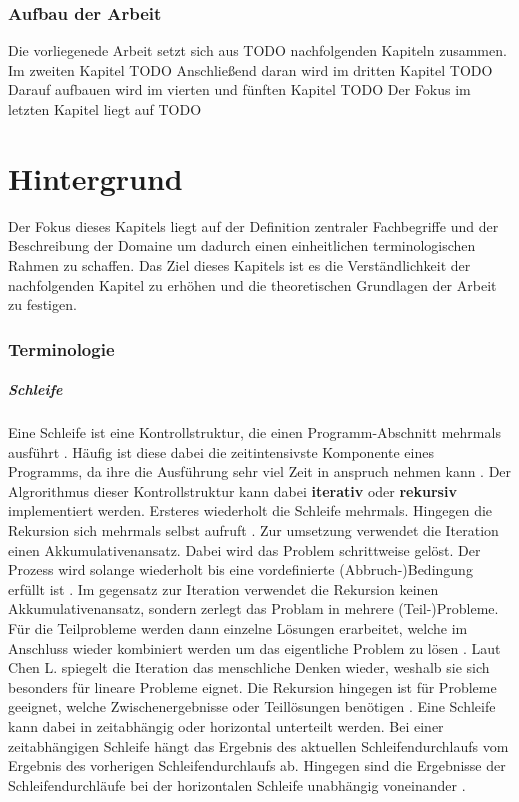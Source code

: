     \subsection{Aufbau der Arbeit}
    Die vorliegenede Arbeit setzt sich aus TODO nachfolgenden Kapiteln zusammen. 
    Im zweiten Kapitel TODO
    Anschließend daran wird im dritten Kapitel TODO
    Darauf aufbauen wird im vierten und fünften Kapitel TODO
    Der Fokus im letzten Kapitel liegt auf TODO 
    \newpage
    \chapter{Hintergrund}
    Der Fokus dieses Kapitels liegt auf der Definition zentraler Fachbegriffe und der Beschreibung der Domaine um dadurch einen einheitlichen terminologischen Rahmen zu schaffen. 
    Das Ziel dieses Kapitels ist es die Verständlichkeit der nachfolgenden Kapitel zu erhöhen und die theoretischen Grundlagen der Arbeit zu festigen.
    \subsection{Terminologie}
    \label{Terminologie}
    \paragraph{Schleife}
    Eine Schleife ist eine Kontrollstruktur, die einen Programm-Abschnitt mehrmals ausführt \cite{22}.
    Häufig ist diese dabei die zeitintensivste Komponente eines Programms, da ihre die Ausführung sehr viel Zeit in anspruch nehmen kann \cite{1}.
    Der Algrorithmus dieser Kontrollstruktur kann dabei \textbf{iterativ} oder \textbf{rekursiv} implementiert werden. Ersteres wiederholt die Schleife mehrmals. Hingegen die Rekursion sich mehrmals selbst aufruft \cite{3}.
    Zur umsetzung verwendet die Iteration einen Akkumulativenansatz. Dabei wird das Problem schrittweise gelöst. Der Prozess wird solange wiederholt bis eine vordefinierte (Abbruch-)Bedingung erfüllt ist \cite{3}.
    Im gegensatz zur Iteration verwendet die Rekursion keinen Akkumulativenansatz, sondern zerlegt das Problam in mehrere (Teil-)Probleme. Für die Teilprobleme werden dann einzelne Lösungen erarbeitet, welche im Anschluss wieder kombiniert werden um das eigentliche Problem zu lösen \cite{3}.
    Laut Chen L. spiegelt die Iteration das menschliche Denken wieder, weshalb sie sich besonders für lineare Probleme eignet. 
    Die Rekursion hingegen ist für Probleme geeignet, welche Zwischenergebnisse oder Teillösungen benötigen \cite{3}.
    Eine Schleife kann dabei in zeitabhängig oder horizontal unterteilt werden. Bei einer zeitabhängigen Schleife hängt das Ergebnis des aktuellen Schleifendurchlaufs vom Ergebnis des vorherigen Schleifendurchlaufs ab. Hingegen sind die Ergebnisse der Schleifendurchläufe bei der horizontalen Schleife unabhängig voneinander \cite{5}.
